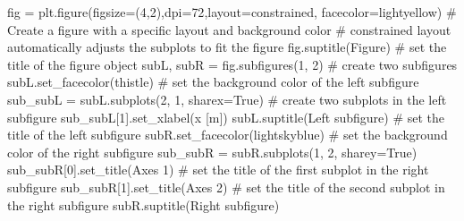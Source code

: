 \documentclass[
  letterpaper,
  DIV=11,
  numbers=noendperiod]{scrreprt}
\newenvironment{Shaded}{\begin{snugshade}}{\end{snugshade}}
\newcommand{\CommentTok}[1]{\textcolor[rgb]{0.37,0.37,0.37}{#1}}
\newcommand{\DecValTok}[1]{\textcolor[rgb]{0.68,0.00,0.00}{#1}}
\newcommand{\NormalTok}[1]{\textcolor[rgb]{0.00,0.23,0.31}{#1}}
\newcommand{\OperatorTok}[1]{\textcolor[rgb]{0.37,0.37,0.37}{#1}}
\newcommand{\StringTok}[1]{\textcolor[rgb]{0.13,0.47,0.30}{#1}}
\newcommand{\VariableTok}[1]{\textcolor[rgb]{0.07,0.07,0.07}{#1}}
\begin{document}
\begin{Shaded}
\begin{Highlighting}[]
\NormalTok{fig }\OperatorTok{=}\NormalTok{ plt.figure(figsize}\OperatorTok{=}\NormalTok{(}\DecValTok{4}\NormalTok{,}\DecValTok{2}\NormalTok{),dpi}\OperatorTok{=}\DecValTok{72}\NormalTok{,layout}\OperatorTok{=}\StringTok{\textquotesingle{}constrained\textquotesingle{}}\NormalTok{, facecolor}\OperatorTok{=}\StringTok{\textquotesingle{}lightyellow\textquotesingle{}}\NormalTok{)}
\CommentTok{\# Create a figure with a specific layout and background color}
\CommentTok{\# constrained layout automatically adjusts the subplots to fit the figure}
\NormalTok{fig.suptitle(}\StringTok{\textquotesingle{}Figure\textquotesingle{}}\NormalTok{) }\CommentTok{\# set the title of the figure object}
\NormalTok{subL, subR }\OperatorTok{=}\NormalTok{ fig.subfigures(}\DecValTok{1}\NormalTok{, }\DecValTok{2}\NormalTok{) }\CommentTok{\# create two subfigures}
\NormalTok{subL.set\_facecolor(}\StringTok{\textquotesingle{}thistle\textquotesingle{}}\NormalTok{) }\CommentTok{\# set the background color of the left subfigure}
\NormalTok{sub\_subL }\OperatorTok{=}\NormalTok{ subL.subplots(}\DecValTok{2}\NormalTok{, }\DecValTok{1}\NormalTok{, sharex}\OperatorTok{=}\VariableTok{True}\NormalTok{) }\CommentTok{\# create two subplots in the left subfigure}
\NormalTok{sub\_subL[}\DecValTok{1}\NormalTok{].set\_xlabel(}\StringTok{\textquotesingle{}x [m]\textquotesingle{}}\NormalTok{)}
\NormalTok{subL.suptitle(}\StringTok{\textquotesingle{}Left subfigure\textquotesingle{}}\NormalTok{) }\CommentTok{\# set the title of the left subfigure}
\NormalTok{subR.set\_facecolor(}\StringTok{\textquotesingle{}lightskyblue\textquotesingle{}}\NormalTok{) }\CommentTok{\# set the background color of the right subfigure}
\NormalTok{sub\_subR }\OperatorTok{=}\NormalTok{ subR.subplots(}\DecValTok{1}\NormalTok{, }\DecValTok{2}\NormalTok{, sharey}\OperatorTok{=}\VariableTok{True}\NormalTok{) }
\NormalTok{sub\_subR[}\DecValTok{0}\NormalTok{].set\_title(}\StringTok{\textquotesingle{}Axes 1\textquotesingle{}}\NormalTok{) }\CommentTok{\# set the title of the first subplot in the right subfigure}
\NormalTok{sub\_subR[}\DecValTok{1}\NormalTok{].set\_title(}\StringTok{\textquotesingle{}Axes 2\textquotesingle{}}\NormalTok{) }\CommentTok{\# set the title of the second subplot in the right subfigure}
\NormalTok{subR.suptitle(}\StringTok{\textquotesingle{}Right subfigure\textquotesingle{}}\NormalTok{)}
\end{Highlighting}
\end{Shaded}
\end{document}
